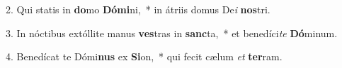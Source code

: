 2. Qui statis in \textbf{do}mo \textbf{Dó}\textbf{mi}ni,~*  in átriis domus De\textit{i} \textbf{nos}tri.\

3. In nóctibus extóllite manus \textbf{ves}tras in \textbf{sanc}ta,~*  et benedíci\textit{te} \textbf{Dó}minum.\

4. Benedícat te Dómi\textbf{nus} ex \textbf{Si}on,~*  qui fecit cælum \textit{et} \textbf{ter}ram.\

